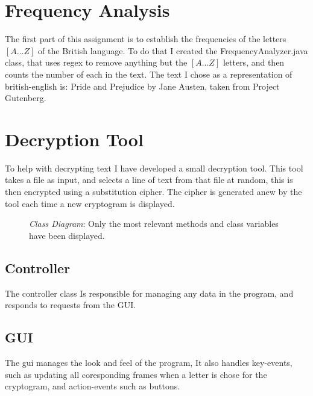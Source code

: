 \section*{Frequency Analysis}
The first part of this assignment is to establish the frequencies of the letters
$[A \dots Z]$ of the British language. To do that I created the
FrequencyAnalyzer.java class, that uses regex\cite{Regex} to remove anything
but the $[A \dots Z]$ letters, and then counts the number of each in the text. 
The text I chose as a representation of british-english is: Pride and Prejudice
by Jane Austen, taken from Project Gutenberg\cite{PnP}.
\section*{Decryption Tool}
To help with decrypting text I have developed a small decryption tool. This tool
takes a file as input, and selects a line of text from that file at random, this
is then encrypted using a substitution cipher. The cipher is generated anew by
the tool each time a new cryptogram is displayed.
\FloatBarrier
\begin{figure}[h]
\centering
{}
\caption{\emph{Class Diagram}: Only the most relevant methods and class
variables have been displayed.}
\label{fig:ClassDia}
\end{figure}
\FloatBarrier
\subsection*{Controller}
The controller class Is responsible for managing any data in the program, and
responds to requests from the GUI.
\subsection*{GUI}
The gui manages the look and feel of the program, It also handles key-events,
such as updating all coresponding frames when a letter is chose for the
cryptogram, and action-events such as buttons.
